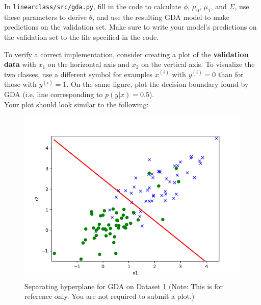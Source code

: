 \item {}
In \texttt{linearclass/src/gda.py}, fill in the code to calculate $\phi$, $\mu_{0}$, $\mu_{1}$, and $\Sigma$, use these parameters to derive $\theta$, and use the resulting GDA model to make predictions on the validation set. Make sure to write your model's predictions on the validation set to the file specified in the code.

To verify a correct implementation, consider creating a plot of the \textbf{validation data} with $x_1$ on the horizontal axis and $x_2$ on the vertical axis. To visualize the two classes, use a different symbol for examples $x^{(i)}$ with $y^{(i)} = 0$ than for those with $y^{(i)} = 1$. On the same figure, plot the decision boundary found by GDA (i.e, line corresponding to $p(y|x) = 0.5$).\\

Your plot should look similar to the following:

\begin{figure}[H]
	\centering
	\vspace{2mm}
	\includegraphics[width=0.65\linewidth]{linearclass/src/p01e_pred_2.png}
    \caption{Separating hyperplane for GDA on Dataset 1 (Note: This is for reference only.  You are not required to submit a plot.)}
\end{figure}
